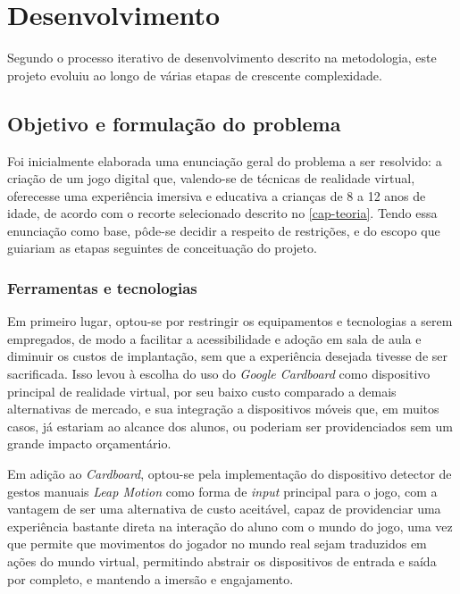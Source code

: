 
\chapter{Desenvolvimento}\label{cap-desenvolvimento}

Segundo o processo iterativo de desenvolvimento descrito na metodologia, 
este projeto evoluiu ao longo de várias etapas de crescente complexidade.


\section{Objetivo e formulação do problema}\label{sec-objetivos-formulacao-problema}

Foi inicialmente elaborada uma enunciação geral do problema a ser resolvido: 
a criação de um jogo digital que, valendo-se de técnicas de realidade 
virtual, oferecesse uma experiência imersiva e educativa a crianças de 8 a 12 
anos de idade, de acordo com o recorte selecionado descrito no \autoref{cap-teoria}.
Tendo essa enunciação como base, pôde-se decidir a respeito de restrições, e 
do escopo que guiariam as etapas seguintes de conceituação do projeto.

\subsection{Ferramentas e tecnologias}\label{subsec-ferramentas-tecnologias}

Em primeiro lugar, optou-se por restringir os equipamentos e tecnologias a 
serem empregados, de modo a facilitar a acessibilidade e adoção em sala de aula 
e diminuir os custos de implantação, sem que a experiência desejada tivesse de 
ser sacrificada. Isso levou à escolha do uso do \textit{Google Cardboard} 
como dispositivo principal de realidade virtual, por seu baixo custo comparado 
a demais alternativas de mercado, e sua integração a dispositivos móveis que, 
em muitos casos, já estariam ao alcance dos alunos, ou poderiam ser 
providenciados sem um grande impacto orçamentário.

Em adição ao \textit{Cardboard}, optou-se pela implementação do dispositivo 
detector de gestos manuais \textit{Leap Motion} como forma de \textit{input}
principal para o jogo, com a vantagem de ser uma alternativa de custo 
aceitável, capaz de providenciar uma experiência bastante direta na interação 
do aluno com o mundo do jogo, uma vez que permite que movimentos do jogador no 
mundo real sejam traduzidos em ações do mundo virtual, permitindo abstrair os 
dispositivos de entrada e saída por completo, e mantendo a imersão e engajamento.

